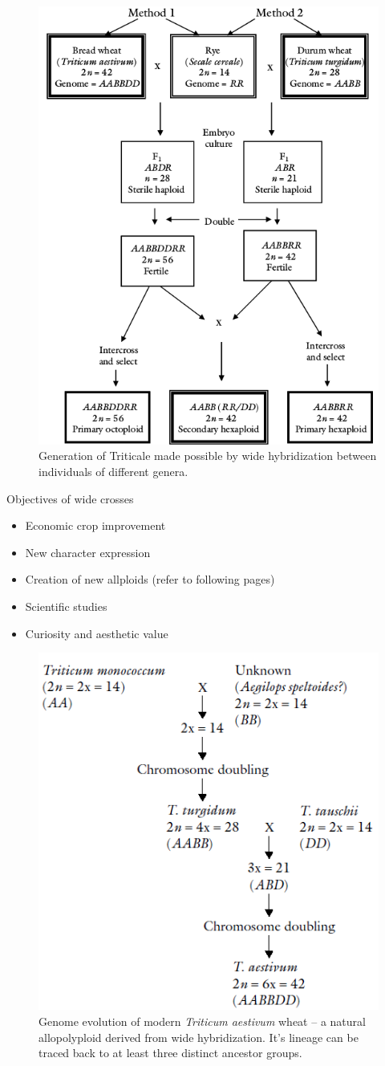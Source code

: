 \documentclass[
  ignorenonframetext,
  aspectratio=169]{beamer}
\providecommand{\tightlist}{%
  \setlength{\itemsep}{0pt}\setlength{\parskip}{0pt}}
\begin{document}
\begin{frame}{}
\protect\hypertarget{section-16}{}
\begin{figure}
\includegraphics[width=0.35\linewidth]{../images/triticale-development} \caption{Generation of Triticale made possible by wide hybridization between individuals of different genera.}\label{fig:triticale-development}
\end{figure}
\end{frame}

\begin{frame}{Objectives of wide crosses}
\protect\hypertarget{objectives-of-wide-crosses}{}
\begin{itemize}
\tightlist
\item
  Economic crop improvement
\item
  New character expression
\item
  Creation of new allploids (refer to following pages)
\item
  Scientific studies
\item
  Curiosity and aesthetic value
\end{itemize}
\end{frame}

\begin{frame}{}
\protect\hypertarget{section-17}{}
\begin{figure}
\includegraphics[width=0.45\linewidth]{../images/wheat_ploidy} \caption{Genome evolution of modern \textit{Triticum aestivum} wheat -- a natural allopolyploid derived from wide hybridization. It's lineage can be traced back to at least three distinct ancestor groups.}\label{fig:wheat-evolution}
\end{figure}
\end{frame}
\end{document}
